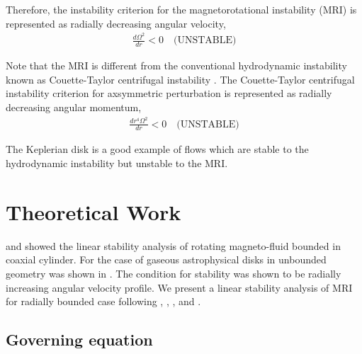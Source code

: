 \documentclass{jfm}
\begin{document}
Therefore, the instability criterion for the magnetorotational instability (MRI) is represented as radially decreasing angular velocity,
\begin{align}
    \frac{d \Omega^2}{dr}<0 \quad \text{(UNSTABLE)}
\end{align} 

Note that the MRI is different from the conventional hydrodynamic instability known as Couette-Taylor centrifugal instability \cite[see][]{Charru2011}. The Couette-Taylor centrifugal instability criterion for axsymmetric perturbation is represented as radially decreasing angular momentum,
\begin{align}
    \frac{d r^4 \Omega^2}{dr} <0 \quad \text{(UNSTABLE)}
\end{align}

The Keplerian disk is a good example of flows which are stable to the hydrodynamic instability but unstable to the MRI.



\section{Theoretical Work}
\label{sec:theory}

\cite{Acheson1973} and \cite{Knobloch1992} showed the linear stability analysis
of rotating magneto-fluid bounded in coaxial cylinder. For the case of gaseous 
astrophysical disks in unbounded geometry was shown in \cite{Balbus1991}. The 
condition for stability was shown to be radially increasing angular velocity 
profile. We present a linear stability analysis of MRI for radially bounded case 
following \cite{Acheson1972}, \cite{Acheson1973a}, \cite{Knobloch1992}, and 
\cite{Julien2010}.


%
%
\subsection{Governing equation}
\end{document}
